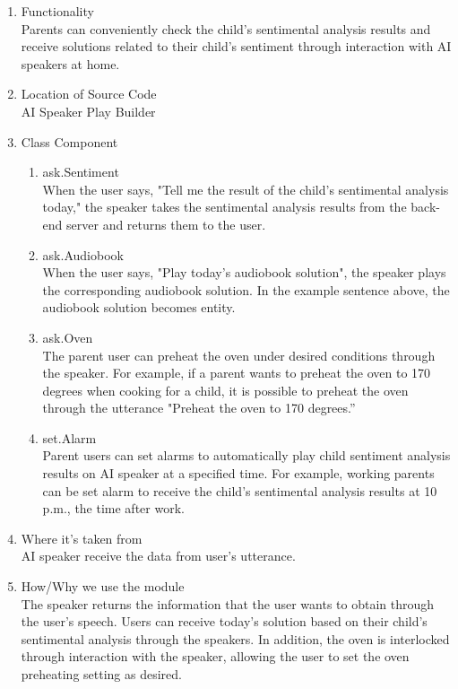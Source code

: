 \documentclass[conference]{IEEEtran}
\begin{document}
\begin{enumerate}
\begin{enumerate}
            \item Functionality
            \\ Parents can conveniently check the child's sentimental analysis results and receive solutions related to their child's sentiment through interaction with AI speakers at home.
            
            \item Location of Source Code
            \\AI Speaker Play Builder
            
            \item Class Component
            \begin{enumerate}
                \item ask.Sentiment
                \\When the user says, "Tell me the result of the child's sentimental analysis today," the speaker takes the sentimental analysis results from the back-end server and returns them to the user.
                
                \item ask.Audiobook
                \\When the user says, "Play today's audiobook solution", the speaker plays the corresponding audiobook solution. In the example sentence above, the audiobook solution becomes entity.
                
                \item ask.Oven
                \\The parent user can preheat the oven under desired conditions through the speaker. For example, if a parent wants to preheat the oven to 170 degrees when cooking for a child, it is possible to preheat the oven through the utterance "Preheat the oven to 170 degrees.”
                
                \item set.Alarm
                \\Parent users can set alarms to automatically play child sentiment analysis results on AI speaker at a specified time. For example, working parents can be set alarm to receive the child's sentimental analysis results at 10 p.m., the time after work.
            \end{enumerate}
            
            \item Where it’s taken from
            \\AI speaker receive the data from user’s utterance.
            
            \item How/Why we use the module
            \\The speaker returns the information that the user wants to obtain through the user's speech. Users can receive today's solution based on their child's sentimental analysis through the speakers. In addition, the oven is interlocked through interaction with the speaker, allowing the user to set the oven preheating setting as desired.
        \end{enumerate}
\end{enumerate}
\end{document}
